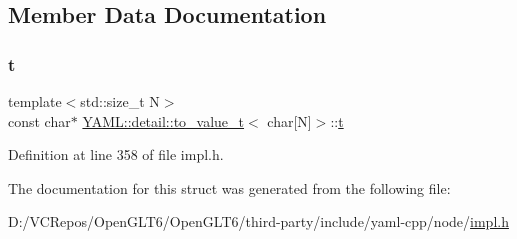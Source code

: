 \subsection{Member Data Documentation}
\mbox{\label{struct_y_a_m_l_1_1detail_1_1to__value__t_3_01char[_n]_4_a35ed5e6cd3f46a1a9986897941130732}} 
\subsubsection{\texorpdfstring{t}{t}}
{\footnotesize\ttfamily template$<$std\+::size\+\_\+t N$>$ \\
const char$\ast$ \mbox{\hyperlink{struct_y_a_m_l_1_1detail_1_1to__value__t}{Y\+A\+M\+L\+::detail\+::to\+\_\+value\+\_\+t}}$<$ char\mbox{[}N\mbox{]}$>$\+::\mbox{\hyperlink{glad_8h_aef9f00bf06d58b8db7e501e287488401}{t}}}



Definition at line 358 of file impl.\+h.



The documentation for this struct was generated from the following file\+:\begin{DoxyCompactItemize}
\item 
D\+:/\+V\+C\+Repos/\+Open\+G\+L\+T6/\+Open\+G\+L\+T6/third-\/party/include/yaml-\/cpp/node/\mbox{\hyperlink{impl_8h}{impl.\+h}}\end{DoxyCompactItemize}
